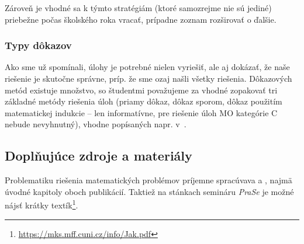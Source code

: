 {Zároveň je vhodné sa k týmto stratégiám (ktoré samozrejme nie sú jediné) priebežne počas školského roka vracať, prípadne zoznam rozširovať o ďalšie.


\subsubsection*{Typy dôkazov}

Ako sme už spomínali, úlohy je potrebné nielen vyriešiť, ale aj dokázať, že naše riešenie je skutočne správne, príp. že sme ozaj našli všetky riešenia. Dôkazových metód existuje množstvo, so študentmi považujeme za vhodné zopakovať tri základné metódy riešenia úloh (priamy dôkaz, dôkaz sporom, dôkaz použitím matematickej indukcie -- len informatívne, pre riešenie úloh MO kategórie C nebude nevyhnutný), vhodne popísaných napr. v~\cite{polak2014}.

\subsection*{Doplňujúce zdroje a materiály}

Problematiku riešenia matematických problémov príjemne spracúvava \cite{holton2010} a \cite{zeitz2007}, najmä úvodné kapitoly oboch publikácií. Taktiež  na stánkach semináru \textit{PraSe} je možné nájsť krátky textík\footnote{\url{https://mks.mff.cuni.cz/info/Jak.pdf}}.
}

